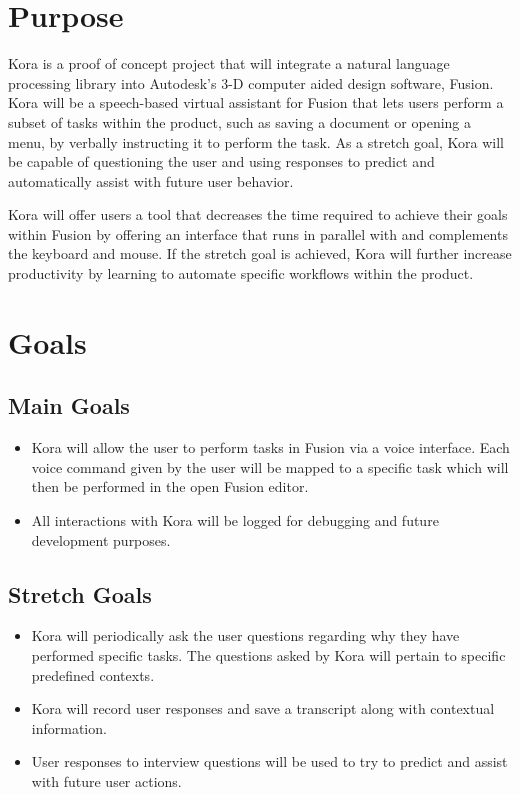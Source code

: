 \documentclass[onecolumn, draftclsnofoot,10pt, compsoc]{IEEEtran}
\begin{document}
\section{Purpose}
	Kora is a proof of concept project that will integrate a natural language processing library into Autodesk's 3-D computer aided design software, Fusion.
	Kora will be a speech-based virtual assistant for Fusion that lets users perform a subset of tasks within the product, such as saving a document or opening a menu, by verbally instructing it to perform the task.
	As a stretch goal, Kora will be capable of questioning the user and using responses to predict and automatically assist with future user behavior.
	
	Kora will offer users a tool that decreases the time required to achieve their goals within Fusion by offering an interface that runs in parallel with and complements the keyboard and mouse.
	If the stretch goal is achieved, Kora will further increase productivity by learning to automate specific workflows within the product.

\section{Goals}
	\subsection{Main Goals}
		\begin{itemize}
			 \item
		 	Kora will allow the user to perform tasks in Fusion via a voice interface.
			Each voice command given by the user will be mapped to a specific task which will then be performed in the open Fusion editor.
			
			\item
			All interactions with Kora will be logged for debugging and future development purposes.
			
		\end{itemize}
	\subsection{Stretch Goals}
		\begin{itemize}
			\item
			Kora will periodically ask the user questions regarding why they have performed specific tasks.
			The questions asked by Kora will pertain to specific predefined contexts.
			
			\item
			Kora will record user responses and save a transcript along with contextual information.
			
			\item
			User responses to interview questions will be used to try to predict and assist with future user actions.
		\end{itemize}
\end{document}
